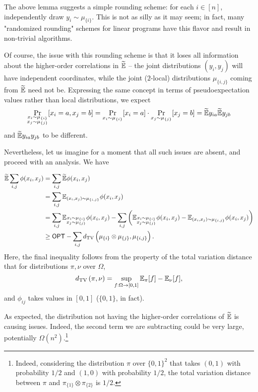 \documentclass{article}
\begin{document}
The above lemma suggests a simple rounding scheme: for each $i \in [n]$, independently draw $y_i \sim \mu_{\{i\}}$. This is not as silly as it may seem; in fact, many "randomized rounding" schemes for linear programs have this flavor and result in non-trivial algorithms.

Of course, the issue with this rounding scheme is that it loses all information about the higher-order correlations in $\widetilde{\mathbb{E}}$ -- the joint distributions $(y_i,y_j)$ will have independent coordinates, while the joint ($2$-local) distributions $\mu_{\{i,j\}}$ coming from $\widetilde{\mathbb{E}}$ need not be. Expressing the same concept in terms of pseudoexpectation values rather than local distributions, we expect
\[ \Pr_{\substack{x_i \sim \mu_{\{i\}} \\ x_j \sim \mu_{\{j\}}}}[x_i = a, x_j = b] = \Pr_{x_i \sim \mu_{\{i\}}}[x_i = a] \cdot \Pr_{x_j \sim \mu_{\{j\}}}[x_j = b] = \widetilde{\mathbb{E}} y_{ia} \widetilde{\mathbb{E}} y_{jb} \]
and $\widetilde{\mathbb{E}} y_{ia} y_{jb}$ to be different.

Nevertheless, let us imagine for a moment that all such issues are absent, and proceed with an analysis. We have

\begin{align*}
	\widetilde{\mathbb{E}} \sum_{i,j} \phi(x_i,x_j) &= \sum_{i,j} \widetilde{\mathbb{E}} \phi(x_i,x_j) \\
		&= \sum_{i,j} \mathbb{E}_{(x_i,x_j) \sim \mu_{\{i,j\}}} \phi(x_i,x_j) \\
		&= \sum_{i,j} \mathbb{E}_{\substack{x_i \sim \mu_{\{i\}} \\ x_j \sim \mu_{\{j\}}}} \phi(x_i,x_j) - \sum_{i,j} \left(\mathbb{E}_{\substack{x_i \sim \mu_{\{i\}} \\ x_j \sim \mu_{\{j\}}}} \phi(x_i,x_j) - \mathbb{E}_{(x_i,x_j) \sim \mu_{\{i,j\}}} \phi(x_i,x_j)\right) \\
		&\ge \mathsf{OPT} - \sum_{i,j} d_{\mathrm{TV}}\left( \mu_{\{i\}} \otimes \mu_{\{j\}} , \mu_{\{i,j\}} \right).
\end{align*}
Here, the final inequality follows from the property of the total variation distance that for distributions $\pi,\nu$ over $\Omega$,
\[ d_{\mathrm{TV}}\left(\pi,\nu\right) = \sup_{f : \Omega \to [0,1]} \mathbb{E}_{\pi}[f] - \mathbb{E}_{\nu}[f], \]
and $\phi_{ij}$ takes values in $[0,1]$ ($\{0,1\}$, in fact).

As expected, the distribution not having the higher-order correlations of $\widetilde{\mathbb{E}}$ is causing issues. Indeed, the second term we are subtracting could be very large, potentially $\Omega(n^2)$.\footnote{Indeed, considering the distribution $\pi$ over $\{0,1\}^2$ that takes $(0,1)$ with probability $1/2$ and $(1,0)$ with probability $1/2$, the total variation distance between $\pi$ and $\pi_{\{1\}} \otimes \pi_{\{2\}}$ is $1/2$.}
\end{document}
